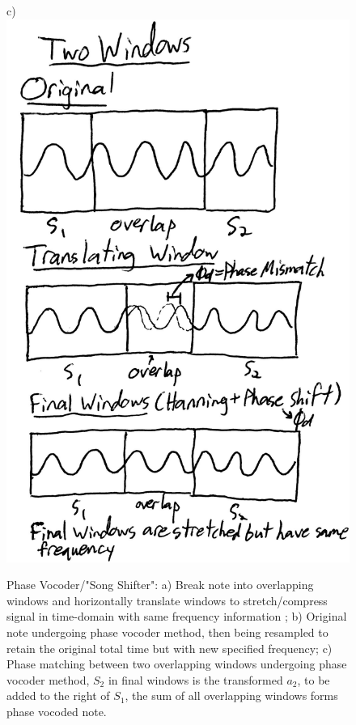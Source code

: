 \documentclass{article}
\begin{document}
\begin{figure}[H]
        c)\includegraphics[scale = 0.12]{TwoWindows.jpg}
        \caption{Phase Vocoder/"Song Shifter": a) Break note into overlapping windows and horizontally translate windows to stretch/compress signal in time-domain with same frequency information \cite{phase}; b) Original note undergoing phase vocoder method, then being resampled to retain the original total time but with new specified frequency; c) Phase matching between two overlapping windows undergoing phase vocoder method, $S_2$ in final windows is the transformed $a_2$, to be added to the right of $S_1$, the sum of all overlapping windows forms phase vocoded note.}
        \label{fig:my_label}
    \end{figure}
\end{document}
